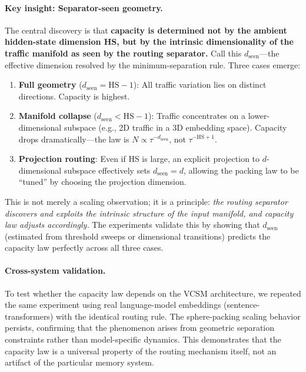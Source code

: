 \documentclass[11pt]{article}
\begin{document}
\paragraph{Key insight: Separator-seen geometry.}
The central discovery is that \textbf{capacity is determined not by the ambient hidden-state dimension HS, but by the intrinsic dimensionality of the traffic manifold as seen by the routing separator.} Call this $d_{\text{seen}}$---the effective dimension resolved by the minimum-separation rule. Three cases emerge:
\begin{enumerate}
  \item \textbf{Full geometry} ($d_{\text{seen}} = \mathrm{HS}-1$): All traffic variation lies on distinct directions. Capacity is highest.
  \item \textbf{Manifold collapse} ($d_{\text{seen}} < \mathrm{HS}-1$): Traffic concentrates on a lower-dimensional subspace (e.g., 2D traffic in a 3D embedding space). Capacity drops dramatically---the law is $N \propto \tau^{-d_{\text{seen}}}$, not $\tau^{-\mathrm{HS}+1}$.
  \item \textbf{Projection routing}: Even if HS is large, an explicit projection to $d$-dimensional subspace effectively sets $d_{\text{seen}} = d$, allowing the packing law to be ``tuned'' by choosing the projection dimension.
\end{enumerate}

This is not merely a scaling observation; it is a principle: \emph{the routing separator discovers and exploits the intrinsic structure of the input manifold, and capacity law adjusts accordingly.} The experiments validate this by showing that $d_{\text{seen}}$ (estimated from threshold sweeps or dimensional transitions) predicts the capacity law perfectly across all three cases.

\paragraph{Cross-system validation.}
To test whether the capacity law depends on the VCSM architecture, we repeated the same experiment using real language-model embeddings (sentence-transformers) with the identical routing rule. The sphere-packing scaling behavior persists, confirming that the phenomenon arises from geometric separation constraints rather than model-specific dynamics. This demonstrates that the capacity law is a universal property of the routing mechanism itself, not an artifact of the particular memory system.
\end{document}
